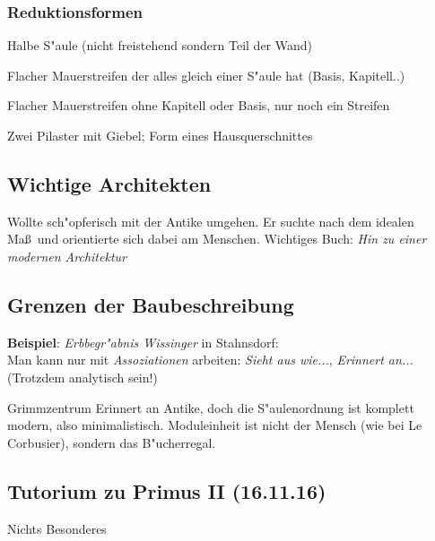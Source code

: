 \documentclass[emulatestandardclasses]{scrartcl}
\begin{document}
\subsubsection{Reduktionsformen}

\begin{description}[leftmargin=!,labelwidth=\widthof{\bfseries Halbs"aulenvorlage}]
  \item[Halbs"aulenvorlage] Halbe S"aule (nicht freistehend sondern Teil der Wand)
  \item[Pilaster] Flacher Mauerstreifen der alles gleich einer S"aule hat (Basis, Kapitell..)
  \item[Lisene] Flacher Mauerstreifen ohne Kapitell oder Basis, nur noch ein Streifen
  \item["Adikula] Zwei Pilaster mit Giebel; Form eines Hausquerschnittes
\end{description}

\subsection{Wichtige Architekten}


\begin{description}[leftmargin=!,labelwidth=\widthof{\bfseries Le Corbusie}]
  \item[Le Corbusier] Wollte sch"opferisch mit der Antike umgehen. Er suchte nach dem idealen Ma\ss~und orientierte sich dabei am Menschen. Wichtiges Buch: \emph{Hin zu einer modernen Architektur}
\end{description}


\subsection{Grenzen der Baubeschreibung}

\textbf{Beispiel}: \emph{Erbbegr"abnis Wissinger} in Stahnsdorf:\\ Man kann nur mit \emph{Assoziationen} arbeiten: \emph{Sieht aus wie...}, \emph{Erinnert an...} (Trotzdem analytisch sein!)

Grimmzentrum Erinnert an Antike, doch die S"aulenordnung ist komplett modern, also minimalistisch. Moduleinheit ist nicht der Mensch (wie bei Le Corbusier), sondern das B"ucherregal.



\subsection{Tutorium zu Primus II (16.11.16)}
Nichts Besonderes
\end{document}
